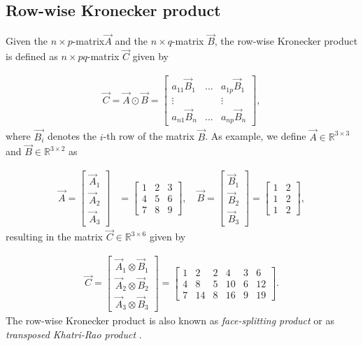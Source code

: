 \begin{appendices}
\section{Row-wise Kronecker product}

Given the $n \times p$-matrix$\vec{A}$ and the $n \times q$-matrix $\vec{B}$, the row-wise Kronecker product is defined as $n \times pq$-matrix $\vec{C}$ given by

\begin{align}
	\vec{C} = \vec{A} \odot \vec{B} = 
			\begin{bmatrix}
				a_{11} \vec{B}_1 & \dots & a_{1p} \vec{B}_1 \\
				\vdots 	   &         &  \vdots \\
				a_{n1} \vec{B}_n & \dots  & a_{np} \vec{B}_n     
			\end{bmatrix},
\end{align}
%
where $\vec{B_i}$ denotes the $i$-th row of the matrix $\vec{B}$. As example, we define $\vec{A} \in \mathbb{R}^{3 \times 3}$ and $\vec{B} \in \mathbb{R}^{3 \times 2}$ as

\begin{align}
	\vec{A} = 
		\begin{bmatrix}
			\vec{A}_1 \\
			\vec{A}_2 \\
			\vec{A}_3 
		\end{bmatrix} &= 
		\begin{bmatrix}
			1 & 2 & 3 \\
			4 & 5 & 6 \\
			7 & 8 & 9 
		\end{bmatrix}, \quad 
	\vec{B} = 
		\begin{bmatrix}
			\vec{B}_1 \\
			\vec{B}_2 \\
			\vec{B}_3 
		\end{bmatrix} = 
		\begin{bmatrix}
			1 & 2  \\
			1 & 2  \\
			1 & 2  
		\end{bmatrix},
\end{align}
%
resulting in the matrix $\vec{C} \in \mathbb{R}^{3 \times 6}$ given by

\begin{align}
		\vec{C} = 
	\begin{bmatrix}
		\vec{A}_1 \otimes \vec{B}_1 \\
		\vec{A}_2 \otimes \vec{B}_2 \\
		\vec{A}_3 \otimes \vec{B}_3 
	\end{bmatrix} = 
	\begin{bmatrix}
		1 & 2 & 2 & 4 & 3 & 6 \\
		4 & 8 & 5 &10 & 6 & 12\\
		7 & 14& 8 & 16& 9 & 19 
	\end{bmatrix}.
\end{align}
%
The row-wise Kronecker product is also known as \emph{face-splitting product} or as \emph{transposed Khatri-Rao product} \cite{slyusar1997analytical}.


\end{appendices}
